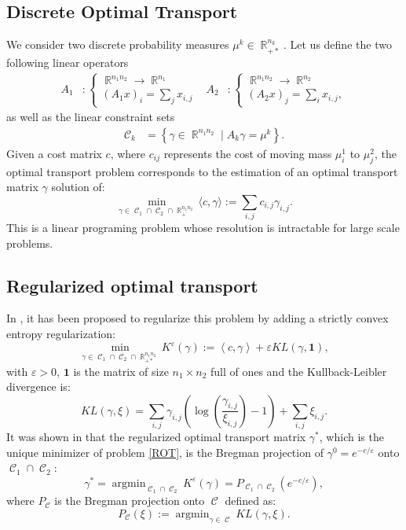 \documentclass{article} %
\newcommand{\scal}[2]{\left\langle #1 , #2 \right\rangle}
\DeclareMathOperator{\IR}{\mathbb{R}}
\DeclareMathOperator*{\argmin}{argmin}
\DeclareMathOperator{\Ccal}{\mathcal{C}}
\renewcommand{\epsilon}{\varepsilon}
\theoremstyle{plain}
\theoremstyle{definition}
\theoremstyle{remark}
\begin{document}
\subsection{Discrete Optimal Transport}
We consider two discrete probability measures $\mu^k \in \IR_{+*}^{n_k}$.
Let us define the two following linear operators
\begin{align*}
A_1 &: \begin{cases}
\IR^{n_1 n_2} \rightarrow \IR^{n_1} \\
(A_1 x)_i = \sum_j x_{i,j}
\end{cases} &
A_2 &: \begin{cases}
\IR^{n_1 n_2} \rightarrow \IR^{n_2}\\
(A_2 x)_j = \sum_i x_{i,j},
\end{cases}
\end{align*}
as well as the linear  constraint sets
\begin{align*}
\Ccal_k &= \left\{ \gamma\in\IR^{n_1 n_2} \mid A_k \gamma = \mu^k \right\}.
\end{align*}
Given a cost matrix $c$, where $c_{ij}$ represents the cost of moving mass $\mu^1_i$ to $\mu^2_j$,  the optimal transport problem corresponds to the estimation of an optimal transport matrix $\gamma$ solution of:
$$\min_{\gamma\in\Ccal_1\cap \Ccal_2\cap \IR^{n_1 n_2}_+} \langle c,\gamma\rangle:=\sum_{i,j}c_{i,j}\gamma_{i,j}.$$
This is a linear programing problem whose resolution is intractable for large scale problems. 

\subsection{Regularized optimal transport}

In \cite{cuturi13}, it has been proposed to regularize this problem by adding a strictly convex entropy regularization:
\begin{equation}\label{ROT}
\min_{\gamma\in\Ccal_1\cap \Ccal_2\cap \IR^{n_1 n_2}_{+*}}K^\epsilon(\gamma) := \scal{c}{\gamma} 
+ \epsilon KL(\gamma,\mathbf{1})
,\end{equation}
with $\epsilon>0$, $\mathbf{1}$ is the matrix of size $n_1\times n_2$ full of ones and the Kullback-Leibler divergence is:
\begin{equation}\label{KL}
KL(\gamma,\xi) = \sum_{i,j} \gamma_{i,j} \left( \log \left( \frac{\gamma_{i,j}}{\xi_{i,j}} \right) -1  \right) + \sum_{i,j} \xi_{i,j}.
\end{equation}
It was shown in \cite{benamou15}  that the regularized optimal transport matrix $\gamma^*$, which is the unique minimizer of problem \eqref{ROT},  is the Bregman projection of $\gamma^0 = e^{-c/\epsilon}$ onto $\Ccal_1 \cap \Ccal_2$:
\begin{equation}\label{eq:reg_ot_pb}
\gamma^* = \argmin_{\Ccal_1 \cap \Ccal_2} K^\epsilon(\gamma)= P_{\Ccal_1 \cap \Ccal_2} (e^{-c/\epsilon}),
\end{equation}
where $P_{\Ccal}$ is the  Bregman projection onto $\Ccal$ defined as:
\[
P_{\Ccal}(\xi) := \argmin_{\gamma \in \Ccal} KL(\gamma,\xi).
\]
\end{document}
